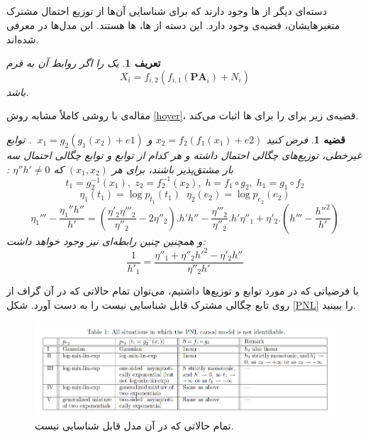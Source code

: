 \documentclass[a4paper,12pt]{article}
\newtheorem{den}{{\large\bf تعریف}}[section]
\newtheorem{thm}{{\large\bf قضیه}}[section]
\begin{document}
\subsection{}
دسته‌ای دیگر از 
ها وجود دارند که برای شناسایی آن‌ها از توزیع احتمال مشترک متغیر‌هایشان، قضیه‌ی 
وجود دارد. این دسته از 
ها، 
ها هستند. این مدل‌ها در
\cite{postnonlinear}
معرفی شده‌اند.
\begin{den}
\textbf{}
یک  را  اگر روابط 
آن به فرم
$$X_i = f_{i,2}(f_{i, 1}(\mathbf{PA}_i) + N_i)$$
باشد.
\end{den}
 مقاله‌ی \cite{postnonlinear} با روشی کاملاً مشابه روش
\eqref{hoyer}،
قضیه‌ی 
زیر برای  را برای
ها اثبات می‌کند.
\begin{thm}
	فرض کنید
	 $x_2 = f_2(f_1(x_1) + e2) $ و $ \;\;x_1 = g_2(g_1(x_2) + e1)$.
توابع غیرخطی، توزیع‌های چگالی احتمال داشته و هر کدام از توابع و توابع چگالی احتمال سه بار مشتق‌پذیر باشند، برای هر  $(x_1, x_2)$ که
	  $\eta''h'\neq 0$ :
	$$t_1 = g_2^{-1}(x_1),\; z_2 = f_2^{-1}(x_2),\; h = f_1\circ g_2,\; h_1 = g_1 \circ f_2$$
	$$\eta_1(t_1) = \log p_{t_1}(t_1) \;\; \eta_2(e_2) = \log p_{e_2}(e_2)$$
	$$\eta_1''' - \frac{\eta_1'' h''}{h'} = (\frac{\eta'_2 \eta'''_2}{\eta''_2} - 2 \eta''_2).h' h'' - \frac{\eta'''_2}{\eta''_2}.h'\eta''_1 + \eta'_2.(h'''-\frac{h''^2}{h'})$$
	و همچنین چنین رابطه‌ای نیز وجود خواهد داشت:
	$$\frac{1}{h'_1} = \frac{\eta''_1 + \eta''_2h'^2-\eta'_2h''}{\eta''_2h'}$$
\end{thm}

با فرضیاتی که در مورد توابع و توزیع‌ها داشتیم، می‌توان تمام حالاتی که در آن گراف از روی تابع چگالی مشترک قابل شناسایی نیست را به دست آورد. شکل 
\eqref{PNL}
را ببینید.

\begin{figure}[h!]
\includegraphics[scale=0.5]{pnl.png}
\caption{تمام حالاتی که در آن مدل قابل شناسایی نیست.}
\label{PNL}
\end{figure}
\end{document}
